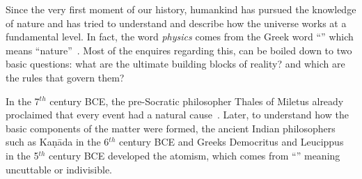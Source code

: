 
Since the very first moment of our history, humankind has pursued the knowledge of nature
and has tried to understand and describe how the universe works at a fundamental level. 
In fact, the word \textit{physics} comes from the Greek word ``\greekphys'' which means 
``nature''~\cite{etymology_web, Greek_web}.
Most of the enquires regarding this, can be boiled down to two basic questions:
what are the ultimate building blocks of reality? and which are the rules that govern them?

In the 7$^{th}$ century BCE, the pre-Socratic philosopher Thales of Miletus already proclaimed that every 
event had a natural cause~\cite{Singer_C}. Later, to understand how the basic components of the matter were
formed, the ancient Indian philosophers such as Kaṇāda 
\cite{leaman2002key} in the 6$^{th}$ century BCE
and Greeks Democritus and Leucippus~\cite{taylor2010atomists} in the 5$^{th}$ century BCE developed the atomism,
which comes from ``\greekatom'' meaning uncuttable or indivisible.



